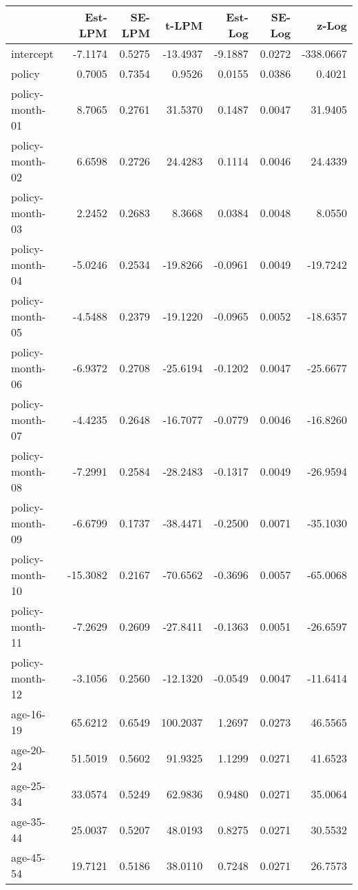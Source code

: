 \documentclass[10pt]{article}
\begin{document}

\begin{table}[b!]
\centering
\begin{tabular}{lrrrrrr}
  \hline
 & Est-LPM & SE-LPM & t-LPM & Est-Log & SE-Log & z-Log \\ 
  \hline
intercept & -7.1174 & 0.5275 & -13.4937 & -9.1887 & 0.0272 & -338.0667 \\ 
  policy & 0.7005 & 0.7354 & 0.9526 & 0.0155 & 0.0386 & 0.4021 \\ 
  policy-month-01 & 8.7065 & 0.2761 & 31.5370 & 0.1487 & 0.0047 & 31.9405 \\ 
  policy-month-02 & 6.6598 & 0.2726 & 24.4283 & 0.1114 & 0.0046 & 24.4339 \\ 
  policy-month-03 & 2.2452 & 0.2683 & 8.3668 & 0.0384 & 0.0048 & 8.0550 \\ 
  policy-month-04 & -5.0246 & 0.2534 & -19.8266 & -0.0961 & 0.0049 & -19.7242 \\ 
  policy-month-05 & -4.5488 & 0.2379 & -19.1220 & -0.0965 & 0.0052 & -18.6357 \\ 
  policy-month-06 & -6.9372 & 0.2708 & -25.6194 & -0.1202 & 0.0047 & -25.6677 \\ 
  policy-month-07 & -4.4235 & 0.2648 & -16.7077 & -0.0779 & 0.0046 & -16.8260 \\ 
  policy-month-08 & -7.2991 & 0.2584 & -28.2483 & -0.1317 & 0.0049 & -26.9594 \\ 
  policy-month-09 & -6.6799 & 0.1737 & -38.4471 & -0.2500 & 0.0071 & -35.1030 \\ 
  policy-month-10 & -15.3082 & 0.2167 & -70.6562 & -0.3696 & 0.0057 & -65.0068 \\ 
  policy-month-11 & -7.2629 & 0.2609 & -27.8411 & -0.1363 & 0.0051 & -26.6597 \\ 
  policy-month-12 & -3.1056 & 0.2560 & -12.1320 & -0.0549 & 0.0047 & -11.6414 \\ 
  age-16-19 & 65.6212 & 0.6549 & 100.2037 & 1.2697 & 0.0273 & 46.5565 \\ 
  age-20-24 & 51.5019 & 0.5602 & 91.9325 & 1.1299 & 0.0271 & 41.6523 \\ 
  age-25-34 & 33.0574 & 0.5249 & 62.9836 & 0.9480 & 0.0271 & 35.0064 \\ 
  age-35-44 & 25.0037 & 0.5207 & 48.0193 & 0.8275 & 0.0271 & 30.5532 \\ 
  age-45-54 & 19.7121 & 0.5186 & 38.0110 & 0.7248 & 0.0271 & 26.7573 \\ 

\end{tabular}
\end{table}
\end{document}
